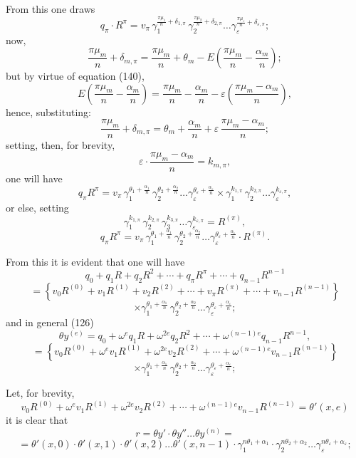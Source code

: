 \documentclass{article}
\begin{document}
From this one draws
\[ q_\pi \cdot R^{\pi} = v_\pi\,\gamma_1^{\frac{\pi\mu_1}{n}+\delta_{1,\pi}}\,\gamma_2^{\frac{\pi\mu_2}{n}+\delta_{2,\pi}} \ldots \gamma_\varepsilon^{\frac{\pi\mu_\varepsilon}{n}+\delta_{\varepsilon,\pi}}; \]
now,
\[ \frac{\pi\mu_m}{n} + \delta_{m,\pi} = \frac{\pi\mu_m}{n} + \theta_m - E\left(\frac{\pi\mu_m}{n} - \frac{\alpha_m}{n}\right); \]
but by virtue of equation (140),
\[ E\left(\frac{\pi\mu_m}{n} - \frac{\alpha_m}{n}\right) = \frac{\pi\mu_m}{n} - \frac{\alpha_m}{n} - \varepsilon\left(\frac{\pi\mu_m-\alpha_m}{n}\right), \]
hence, substituting:
\[ \frac{\pi\mu_m}{n} + \delta_{m,\pi} = \theta_m + \frac{\alpha_m}{n} + \varepsilon\,\frac{\pi\mu_m-\alpha_m}{n}; \tag{144} \]
setting, then, for brevity,
\[ \varepsilon \cdot \frac{\pi\mu_m-\alpha_m}{n} = k_{m,\pi}, \tag{145} \]
one will have
\[ q_\pi R^{\pi} = v_\pi\,\gamma_1^{\theta_1+\frac{\alpha_1}{n}}\,\gamma_2^{\theta_2+\frac{\alpha_2}{n}} \ldots \gamma_\varepsilon^{\theta_\varepsilon+\frac{\alpha_\varepsilon}{n}} \times \gamma_1^{k_{1,\pi}}\,\gamma_2^{k_{2,\pi}} \ldots \gamma_\varepsilon^{k_{\varepsilon,\pi}}, \tag{146} \]
or else, setting
\[ \gamma_1^{k_{1,\pi}}\,\gamma_2^{k_{2,\pi}}\,\gamma_3^{k_{3,\pi}} \ldots \gamma_\varepsilon^{k_{\varepsilon,\pi}} = R^{(\pi)}, \tag{147} \]
\[ q_\pi R^{\pi} = v_\pi\,\gamma_1^{\theta_1+\frac{\alpha_1}{n}}\,\gamma_2^{\theta_2+\frac{\alpha_2}{n}} \ldots \gamma_\varepsilon^{\theta_\varepsilon+\frac{\alpha_\varepsilon}{n}} \cdot R^{(\pi)}. \tag{148} \]

From this it is evident that one will have
\[ q_0+q_1 R+q_2 R^{2}+\cdots+q_\pi R^{\pi}+\cdots+q_{n-1}R^{n-1} \]
\[ = \left\{v_0 R^{(0)}+v_1 R^{(1)}+v_2 R^{(2)}+\cdots+v_\pi R^{(\pi)}+\cdots+v_{n-1}R^{(n-1)}\right\} \]
\[ \times \gamma_1^{\theta_1+\frac{\alpha_1}{n}}\,\gamma_2^{\theta_2+\frac{\alpha_2}{n}} \ldots \gamma_\varepsilon^{\theta_\varepsilon+\frac{\alpha_\varepsilon}{n}}; \tag{149} \]
and in general (126)
\[ \theta y^{(e)} = q_0 + \omega^{e}q_1 R + \omega^{2e}q_2 R^{2} + \cdots + \omega^{(n-1)e}q_{n-1}R^{n-1}, \]
\[ = \left\{v_0 R^{(0)}+\omega^{e}v_1 R^{(1)}+\omega^{2e}v_2 R^{(2)}+\cdots+\omega^{(n-1)e}v_{n-1}R^{(n-1)}\right\} \]
\[ \times \gamma_1^{\theta_1+\frac{\alpha_1}{n}}\,\gamma_2^{\theta_2+\frac{\alpha_2}{n}} \ldots \gamma_\varepsilon^{\theta_\varepsilon+\frac{\alpha_\varepsilon}{n}}; \tag{150} \]

Let, for brevity,
\[ v_0 R^{(0)}+\omega^{e}v_1 R^{(1)}+\omega^{2e}v_2 R^{(2)}+\cdots+\omega^{(n-1)e}v_{n-1}R^{(n-1)} = \theta'(x, e) \tag{151} \]
it is clear that
\[ r = \theta y' \cdot \theta y'' \ldots \theta y^{(n)} = \]
\[ = \theta'(x, 0) \cdot \theta'(x, 1) \cdot \theta'(x, 2) \ldots \theta'(x, n-1) \cdot \gamma_1^{n\theta_1+\alpha_1} \cdot \gamma_2^{n\theta_2+\alpha_2} \ldots \gamma_\varepsilon^{n\theta_\varepsilon+\alpha_\varepsilon}; \tag{152} \]
\end{document}
